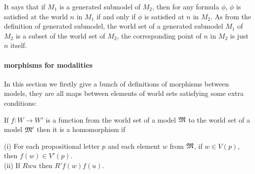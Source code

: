 \documentclass{report}
\renewcommand{\HOLinline}[1]{\ensuremath{#1}}
\begin{document}
It says that if $M_1$ is a generated submodel of $M_2$, then for any formula $\phi$, $\phi$ is satisfied at the world $n$ in $M_1$ if and only if $\phi$ is satisfied at $n$ in $M_2$. As from the definition of generated submodel, the world set of a generated submodel $M_1$ of $M_2$ is a subset of the world set of $M_2$, the corresponding point of $n$ in $M_2$ is just $n$ itself.

\paragraph{morphisms for modalities}

In this section we firstly give a bunch of definitions of morphisms between models, they are all maps between elements of world sets satisfying some extra conditions:

If $f:W\to W'$ is a function from the world set of a model \HOLinline{\HOLFreeVar{\ensuremath{\mathfrak{M}}}} to the world set of a model \HOLinline{\HOLFreeVar{\ensuremath{\mathfrak{M}'}}} then it is a homomorphism if

(i) For each propositional letter $p$ and each element $w$ from \HOLinline{\HOLFreeVar{\ensuremath{\mathfrak{M}}}}, if $w\in V(p)$, then $f(w) \in V'(p)$.\\
(ii) If $Rwu$ then $R'f(w)f(u)$.
\end{document}
